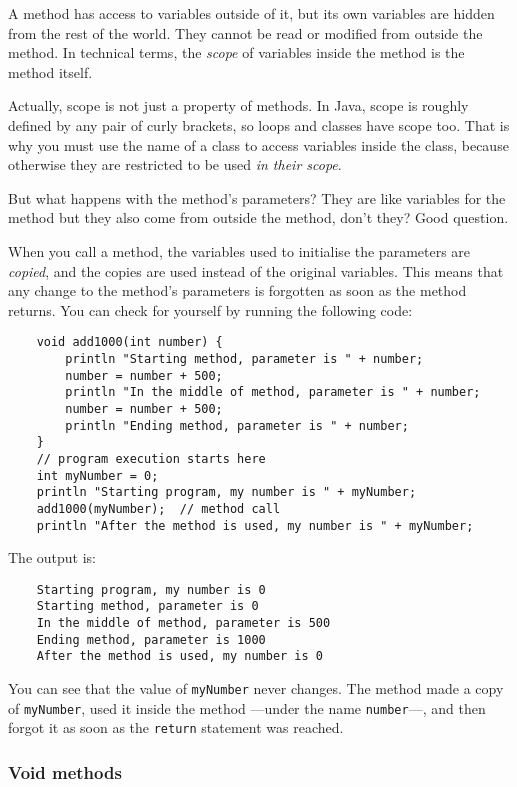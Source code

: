 A method has access to variables outside of it, but its own variables
are hidden from the rest of the world. They cannot be read or modified
from outside the method. In technical terms, the \emph{scope} of
variables inside the method is the method itself. 

Actually, scope is not just a property of methods. In Java, scope is
roughly defined by any pair of curly brackets, so loops and classes
have scope too. That is why you must use the name of a class to access
variables inside the class, because otherwise they are restricted to
be used \emph{in their scope}. 

But what happens with the method's parameters? They are like variables
for the method but they also come from outside the method, don't they?
Good question. 

When you call a method, the variables used to initialise the
parameters are \emph{copied}, and the copies are used instead of the
original variables. This means that any change to the method's
parameters is forgotten as soon as the method returns. You can check
for yourself by running the following code: 

\begin{verbatim}
    void add1000(int number) {
        println "Starting method, parameter is " + number;
        number = number + 500;
        println "In the middle of method, parameter is " + number;
        number = number + 500;
        println "Ending method, parameter is " + number;
    }
    // program execution starts here
    int myNumber = 0;
    println "Starting program, my number is " + myNumber;
    add1000(myNumber);  // method call
    println "After the method is used, my number is " + myNumber;
\end{verbatim}

The output is: 

\begin{verbatim}
    Starting program, my number is 0
    Starting method, parameter is 0
    In the middle of method, parameter is 500
    Ending method, parameter is 1000
    After the method is used, my number is 0
\end{verbatim}

You can see that the value of \verb+myNumber+ never changes. The
method made a copy of \verb+myNumber+, used it inside the method 
---under the name
\verb+number+---, and then forgot it as soon as the
\verb+return+ statement was reached. 

\subsubsection*{Void methods}
\label{void}

